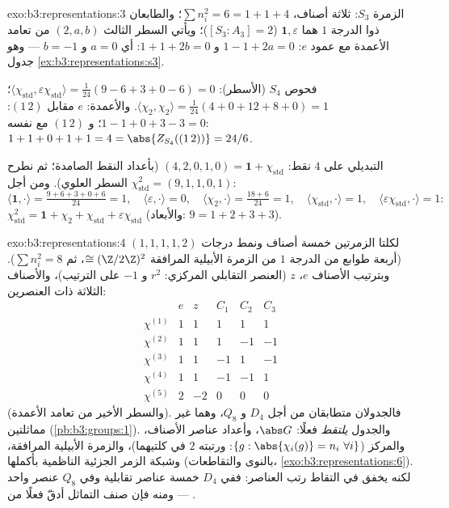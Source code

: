 \begin{solution}{exo:b3:representations:3}
الزمرة $S_3$: ثلاثة أصناف، $\sum n_i^2 = 6 = 1 + 1 + 4$؛ والطابعان ذوا الدرجة $1$ هما
$\mathbf 1, \varepsilon$ ($[S_3 :
A_3] = 2$)؛ ويأتي السطر الثالث $(2, a, b)$ من تعامد الأعمدة
مع عمود $e$: $1 - 1 + 2a = 0$ و $1 + 1 +
2b = 0$: أي $a = 0$ و $b = -1$
--- وهو جدول \cref{ex:b3:representations:s3}.

فحوص $S_4$ (الأسطر): $\langle\chi_{\mathrm{std}},
\varepsilon\chi_{\mathrm{std}}\rangle = \frac1{24}(9 - 6 + 3 + 0
- 6) = 0$؛ $\langle\chi_2,\chi_2\rangle = \frac1{24}(4 + 0 + 12
+ 8 + 0) = 1$. والأعمدة: $e$ مقابل
$(1\,2)$: $1 - 1 + 0 + 3 - 3
= 0$؛ و $(1\,2)$ مع نفسه: $1 + 1 + 0 + 1 + 1 = 4 =
\abs{Z_{S_4}((1\,2))} = 24/6$.

 التبديلي على $4$ نقط: $(4, 2, 0, 1, 0) = \mathbf
1 + \chi_{\mathrm{std}}$ (بأعداد النقط الصامدة؛ ثم
نطرح السطر العلوي). ومن أجل $\chi_{\mathrm{std}}^2 = (9, 1, 1, 0, 1)$:
\[
\langle\mathbf1,\cdot\rangle = \tfrac{9 + 6 + 3 + 0 + 6}{24} =
1,\quad
\langle\varepsilon,\cdot\rangle = 0,\quad
\langle\chi_2,\cdot\rangle = \tfrac{18 + 6}{24} = 1,\quad
\langle\chi_{\mathrm{std}},\cdot\rangle = 1,\quad
\langle\varepsilon\chi_{\mathrm{std}},\cdot\rangle = 1:
\]
$\chi_{\mathrm{std}}^2 = \mathbf 1 + \chi_2 +
\chi_{\mathrm{std}} + \varepsilon\chi_{\mathrm{std}}$
(والأبعاد: $9 = 1 + 2 + 3 + 3$).
\end{solution}

\begin{solution}{exo:b3:representations:4}
لكلتا الزمرتين خمسة أصناف ونمط درجات $(1,1,1,1,2)$ (أربعة طوابع
من الدرجة $1$ من الزمرة الأبيلية المرافقة $\cong (\Z/2\Z)^2$، ثم
$\sum n_i^2 = 8$). وبترتيب الأصناف $e$، $z$ (العنصر التقابلي
المركزي: $r^2$ و $-1$ على الترتيب)، والأصناف الثلاثة ذات
العنصرين:
\[
\begin{array}{c|ccccc}
& e & z & C_1 & C_2 & C_3\\
\hline
\chi^{(1)} & 1 & 1 & 1 & 1 & 1\\
\chi^{(2)} & 1 & 1 & 1 & -1 & -1\\
\chi^{(3)} & 1 & 1 & -1 & 1 & -1\\
\chi^{(4)} & 1 & 1 & -1 & -1 & 1\\
\chi^{(5)} & 2 & -2 & 0 & 0 & 0
\end{array}
\]
(والسطر الأخير من تعامد الأعمدة). فالجدولان متطابقان من أجل
$D_4$ و $Q_8$، وهما غير مماثلتين (\cref{pb:b3:groups:1}). والجدول
\emph{يلتقط} فعلًا: $\abs
G$، وأعداد عناصر الأصناف، والمركز
($\{g : \abs{\chi_i(g)} = n_i\
\forall i\}$: ورتبته $2$ في كلتيهما)، والزمرة الأبيلية المرافقة،
وشبكة الزمر الجزئية الناظمية بأكملها (بالنوى والتقاطعات،
\cref{exo:b3:representations:6}). لكنه يخفق في التقاط رتب العناصر: ففي $D_4$ خمسة
عناصر تقابلية وفي $Q_8$ عنصر واحد --- ومنه فإن صنف التماثل أدقّ
فعلًا من .
\end{solution}

